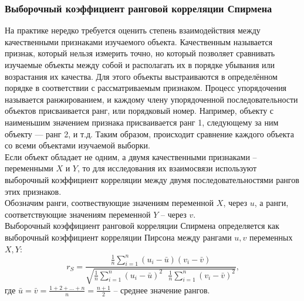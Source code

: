 \subsubsection{Выборочный коэффициент ранговой корреляции Спирмена}
На практике нередко требуется оценить степень взаимодействия между качественными признаками изучаемого объекта. Качественным называется признак, который нельзя измерить точно, но который позволяет сравнивать изучаемые объекты между собой и располагать их в порядке убывания или возрастания их качества. Для этого объекты выстраиваются в определённом порядке в соответствии с рассматриваемым признаком. Процесс упорядочения называется ранжированием, и каждому члену упорядоченной последовательности объектов присваивается ранг, или порядковый номер. Например, объекту с наименьшим значением признака присваивается ранг 1, следующему за ним объекту — ранг 2, и т.д. Таким образом, происходит сравнение каждого объекта со всеми объектами изучаемой выборки. \\
Если объект обладает не одним, а двумя качественными признаками -- переменными $X \text{ и } Y$, то для исследования их взаимосвязи используют выборочный коэффициент корреляции между двумя последовательностями рангов этих признаков. \\
Обозначим ранги, соотвествующие значениям переменной $X$, через $u$, а ранги, соответствующие значениям переменной $Y$ -- через $v$. \\
Выборочный коэффициент ранговой корреляции Спирмена определяется как выборочный коэффициент корреляции Пирсона между рангами $u, v$ переменных $X, Y$:
\begin{equation}
	r_S = \dfrac{\frac{1}{n} \sum_{i=1}^{n} (u_i - \bar{u})(v_i - \bar{v})}{\sqrt{\frac{1}{n} \sum_{i=1}^{n} (u_i - \bar{u})^2 \text{ } \frac{1}{n} \sum_{i=1}^{n} (v_i - \bar{v})^2}} \text{,}
\end{equation}
где $\bar{u} = \bar{v} = \frac{1+2+ \dots + n}{n} = \frac{n+1}{2}$ -- среднее значение рангов.

